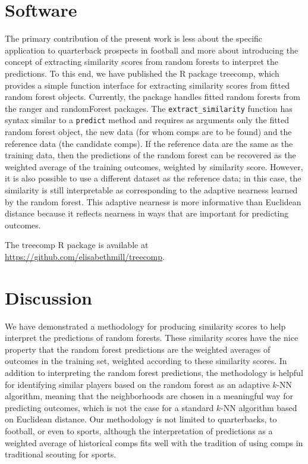 \documentclass[Review, sageh, times]{sagej}
\begin{document}
\section{Software}
\label{sec:software}
The primary contribution of the present work is less about the specific application to quarterback prospects in football and more about introducing the concept of extracting similarity scores from random forests to interpret the predictions. To this end, we have published the R package treecomp, which provides a simple function interface for extracting similarity scores from fitted random forest objects. Currently, the package handles fitted random forests from the ranger and randomForest packages. The \texttt{extract\_similarity} function has syntax similar to a \texttt{predict} method and requires as arguments only the fitted random forest object, the new data (for whom comps are to be found) and the reference data (the candidate comps). If the reference data are the same as the training data, then the predictions of the random forest can be recovered as the weighted average of the training outcomes, weighted by similarity score. However, it is also possible to use a different dataset as the reference data; in this case, the similarity is still interpretable as corresponding to the adaptive nearness learned by the random forest. This adaptive nearness is more informative than Euclidean distance because it reflects nearness in ways that are important for predicting outcomes.

The treecomp R package is available at \url{https://github.com/elisabethmill/treecomp}.

\section{Discussion}
\label{sec:discussion}
We have demonstrated a methodology for producing similarity scores to help interpret the predictions of random forests. These similarity scores have the nice property that the random forest predictions are the weighted averages of outcomes in the training set, weighted according to these similarity scores. In addition to interpreting the random forest predictions, the methodology is helpful for identifying similar players based on the random forest as an adaptive $k$-NN algorithm, meaning that the neighborhoods are chosen in a meaningful way for predicting outcomes, which is not the case for a standard $k$-NN algorithm based on Euclidean distance. Our methodology is not limited to quarterbacks, to football, or even to sports, although the interpretation of predictions as a weighted average of historical comps fits well with the tradition of using comps in traditional scouting for sports.
\end{document}
